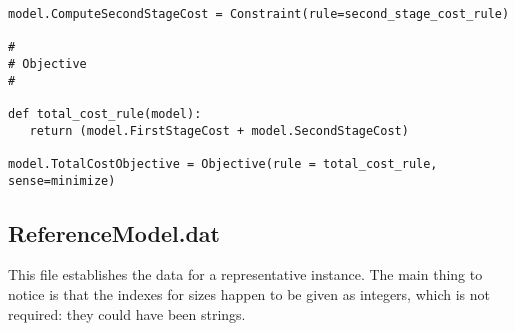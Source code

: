 {\begin{verbatim}
model.ComputeSecondStageCost = Constraint(rule=second_stage_cost_rule)

#
# Objective
#

def total_cost_rule(model):
   return (model.FirstStageCost + model.SecondStageCost)

model.TotalCostObjective = Objective(rule = total_cost_rule, sense=minimize)
\end{verbatim}
}

\subsection{ReferenceModel.dat}

This file establishes the data for a representative instance. The main thing to
notice is that the indexes for sizes happen to be given as integers, which is
not required: they could have been strings.


